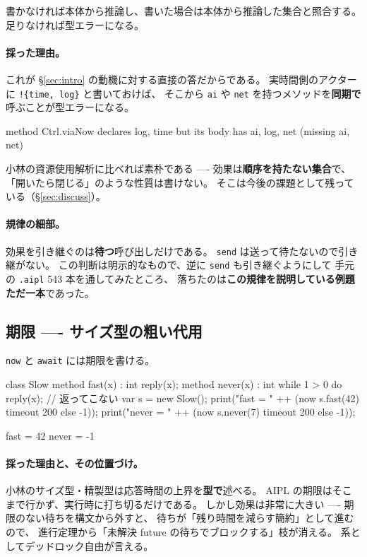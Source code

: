 \documentclass[11pt,a4paper]{ltjsarticle}
\theoremstyle{definition}
\theoremstyle{remark}
\begin{document}
書かなければ本体から推論し、書いた場合は本体から推論した集合と照合する。
足りなければ型エラーになる。

\paragraph{採った理由。}
これが \S\ref{sec:intro} の動機に対する直接の答だからである。
実時間側のアクターに \texttt{!\{time, log\}} と書いておけば、
そこから \texttt{ai} や \texttt{net} を持つメソッドを\textbf{同期で}呼ぶことが型エラーになる。

\begin{term}
 method Ctrl.viaNow declares {log, time}
             but its body has {ai, log, net} (missing {ai, net})
\end{term}

小林の資源使用解析に比べれば素朴である ---- 効果は\textbf{順序を持たない集合}で、
「開いたら閉じる」のような性質は書けない。
そこは今後の課題として残っている（\S\ref{sec:discuss}）。

\paragraph{規律の細部。}
効果を引き継ぐのは\textbf{待つ}呼び出しだけである。
\texttt{send} は送って待たないので引き継がない。
この判断は明示的なもので、逆に \texttt{send} も引き継ぐようにして
手元の \texttt{.aipl} 543 本を通してみたところ、
落ちたのは\textbf{この規律を説明している例題ただ一本}であった。

\subsection{期限 ---- サイズ型の粗い代用}

\texttt{now} と \texttt{await} には期限を書ける。

\begin{aipl}
class Slow {
  method fast(x) : int { reply(x); }
  method never(x) : int { while 1 > 0 do { } reply(x); }   // 返ってこない
}
var s = new Slow();
print("fast  = " ++ (now s.fast(42) timeout 200 else -1));
print("never = " ++ (now s.never(7) timeout 200 else -1));
\end{aipl}
\begin{term}
fast  = 42
never = -1
\end{term}

\paragraph{採った理由と、その位置づけ。}
小林のサイズ型・精製型は応答時間の上界を\textbf{型で}述べる。
AIPL の期限はそこまで行かず、実行時に打ち切るだけである。
しかし効果は非常に大きい ---- 期限のない待ちを構文から外すと、
待ちが「残り時間を減らす簡約」として進むので、
進行定理から「未解決 future の待ちでブロックする」枝が消える。
系としてデッドロック自由が言える。
\end{document}
